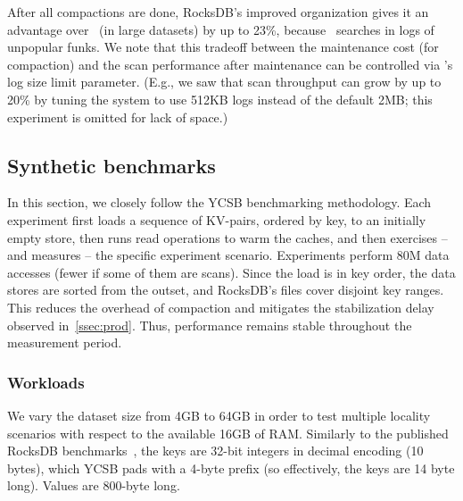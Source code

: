 After all compactions are done, RocksDB's improved organization gives it an advantage  over \sys\
(in large datasets) by up to 23\%, because \sys\ searches
in  logs of unpopular funks. We note that this tradeoff between the maintenance cost (for compaction) 
and the scan performance after maintenance  can be controlled via \sys's log size limit parameter.
(E.g., we saw that scan throughput can  grow by up to 20\%  by tuning the system to use 512KB logs instead of
the default 2MB; this experiment is omitted for lack of space.)





\subsection{Synthetic benchmarks}
\label{ssec:synthetic} 


In this section, we closely follow the YCSB benchmarking methodology. 
Each experiment first  loads a sequence of KV-pairs, ordered by key, to an initially empty store, then  
runs read operations to warm the caches, and then exercises -- and measures --  the specific experiment 
scenario. Experiments perform 80M data accesses (fewer if some of them are scans). 
Since the load is in key order, the data stores are sorted from the outset, and RocksDB's files cover disjoint key ranges. 
This reduces the overhead of compaction and mitigates the stabilization delay observed in~\cref{ssec:prod}.  Thus, 
performance remains stable throughout the measurement period.

\subsubsection{Workloads}

We vary the dataset size from 4GB to 64GB in order to test multiple locality 
scenarios with respect to the available 16GB of RAM. Similarly to the published RocksDB benchmarks~\cite{RocksDBPerf}, 
the keys are 32-bit integers in decimal encoding (10 bytes), which YCSB pads with a 4-byte prefix (so effectively, 
the keys are 14 byte long). Values are 800-byte long. 


